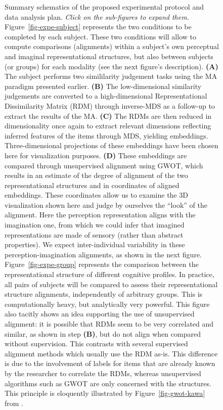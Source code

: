 \documentclass[
  authoryear]{elsarticle}
\begin{document}
\begin{figure}
\caption{\label{fig-expe-conditions}Summary schematics of the proposed
experimental protocol and data analysis plan. \emph{Click on the
sub-figures to expand them.} Figure~\ref{fig-expe-subject} represents
the two conditions to be completed by each subject. These two conditions
will allow to compute comparisons (alignments) within a subject's own
perceptual and imaginal representational structures, but also between
subjects (or groups) for each modality (see the next figure's
description). \textbf{(A)} The subject performs two simililarity
judgement tasks using the MA paradigm presented earlier. \textbf{(B)}
The low-dimensional similarity judgements are converted to a
high-dimensional Representational Dissimilarity Matrix (RDM) through
inverse-MDS as a follow-up to extract the results of the MA.
\textbf{(C)} The RDMs are then reduced in dimensionality once again to
extract relevant dimensions reflecting inferred features of the items
through MDS, yielding embeddings. Three-dimensional projections of these
embeddings have been chosen here for visualization purposes.
\textbf{(D)} These embeddings are compared through unsupervised
alignment using GWOT, which results in an estimate of the degree of
alignment of the two representational structures and in coordinates of
aligned embeddings. These coordinates allow us to examine the 3D
visualization shown here and judge by ourselves the ``look'' of the
alignment. Here the perception representation aligns with the
imagination one, from which we could infer that imagined representations
are made of sensory (rather than abstract properties). We expect
inter-individual variability in these perception-imagination alignments,
as shown in the next figure. Figure~\ref{fig-expe-group} represents the
comparison between the representational structure of different cognitive
profiles. In practice, all pairs of subjects will be compared to assess
their representational structure alignments, independently of arbitrary
groups. This is computationally heavy, but analytically very powerful.
This figure also tacitly shows an idea supporting the use of
unsupervised alignment: it is possible that RDMs seem to be very
correlated and similar, as shown in step \textbf{(B)}, but do not align
when compared without supervision. This contrasts with several
supervised alignment methods \citep[such as RSA,
see][]{kriegeskorte2008} which usually use the RDM as-is. This
difference is due to the involvement of labels for items that are
already known by the researcher to correlate the RDMs, whereas
unsupervised algorithms such as GWOT are only concerned with the
structures. This principle is eloquently illustrated by
Figure~\ref{fig-gwot-kawa} from \citet{kawakita2023}.}

\end{figure}%
\end{document}
